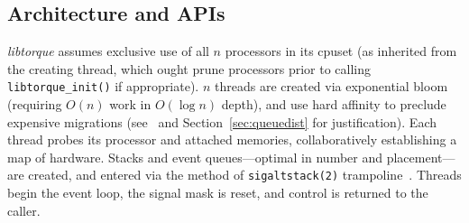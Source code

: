 \documentclass[letterpaper,10pt]{article}
\begin{document}
\begin{multicols}{2}
\section{Architecture and APIs}
\textit{libtorque} assumes exclusive use of all $n$ processors in its cpuset (as inherited from the creating thread, which
ought prune processors prior to calling \texttt{libtorque\_init()} if appropriate).
$n$ threads are created via exponential bloom (requiring $O(n)$ work in $O(\log{n})$ depth),
and use hard affinity to preclude expensive migrations (see~\cite{Porterfield08}
and Section~\ref{sec:queuedist} for justification). Each thread probes its
processor and attached memories, collaboratively establishing a map of hardware.
Stacks and event queues---optimal in number and placement---are created,
and entered via the method of \texttt{sigaltstack(2)} trampoline~\cite{Engelschall00}. Threads begin the event loop,
the signal mask is reset, and control is returned to the caller.


\end{multicols}
\end{document}
